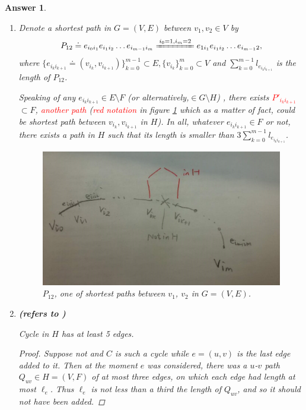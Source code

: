 \documentclass[11pt]{article}
\theoremstyle{numberplain}
\theoremstyle{nonumberplain}
\newtheorem{proof}{Proof}
\newtheorem{ans}{Answer}
\newcommand{\dps}{\displaystyle}
\newcommand{\0}{{\mathbf{0}}}
\begin{document}
\begin{ans}
\begin{enumerate}
\item Denote a shortest path in $G=(V,E)$ between $v_1, v_2\in V$ by
$$P_{12}\doteq e_{i_0i_1}e_{i_1 i_2}\ldots e_{i_{m-1} i_m}\xlongequal{i_0=1,i_m=2}e_{1i_1}e_{i_1 i_2}\ldots e_{i_{m-1} 2},
$$
where $\{e_{i_ki_{k+1}}\doteq (v_{i_k}, v_{i_{k+1}}) \}_{k=0}^{m-1}\subset E,\{v_{i_k} \}_{k=0}^m\subset
 V$ and $\dps \sum_{k=0}^{m-1}l_{e_{i_k i_{k+1}}}$ is the length of $P_{12}$.\par
Speaking of any $e_{i_k i_{k+1}}\in E\setminus F$ (or alternatively,$\in G\setminus H$) , there exists \textcolor{red}{$P'_{i_k i_{k+1}}$} $\subset F$, \textcolor{red}{another path} (\textcolor{red}{red notation} in figure \ref{fig:path12} which as a matter of fact, could be shortest path between $v_{i_k}, v_{i_{k+1}}$ in $H$).  In all, whatever $e_{i_k i_{k+1}}\in F$ or not, there exists a path in $H$ such that its length is smaller than $3\dps \sum_{k=0}^{m-1}l_{e_{i_k i_{k+1}}}$.
\begin{figure}
\begin{center}
\includegraphics[width=\textwidth]{4_31_a.jpg}
\end{center}
\caption{$P_{12}$, one of shortest paths between $v_1$, $v_2$ in $G=(V,E)$.}
\label{fig:path12}
\end{figure}
\item \textbf{(refers to \cite{solcornell})} \begin{lem}
Cycle in $H$ has at least 5 	edges.
\label{lem: cycle in H has at least 5 edges}
\end{lem}
\begin{proof}
Suppose not and $C$ is such a cycle while $e = (u,v)$ is the last edge added to it. Then at the moment $e$ was considered, there was a $u$-$v$ path $Q_{uv}\in H=(V,F)$  of at most three edges, on which each edge had length at most $\ell_e$. Thus $\ell_e$ is not less than a third the length of $Q_{uv}$, and so it should not have been added.

\end{proof}
\end{enumerate}
\end{ans}
\end{document}
